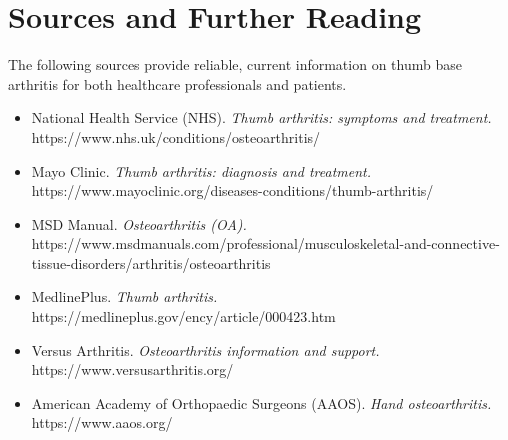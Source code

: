 \section*{Sources and Further Reading}
The following sources provide reliable, current information on thumb base arthritis for both healthcare professionals and patients.
\begin{itemize}
    \item National Health Service (NHS). \textit{Thumb arthritis: symptoms and treatment.} https://www.nhs.uk/conditions/osteoarthritis/
    \item Mayo Clinic. \textit{Thumb arthritis: diagnosis and treatment.} https://www.mayoclinic.org/diseases-conditions/thumb-arthritis/
    \item MSD Manual. \textit{Osteoarthritis (OA).} https://www.msdmanuals.com/professional/musculoskeletal-and-connective-tissue-disorders/arthritis/osteoarthritis
    \item MedlinePlus. \textit{Thumb arthritis.} https://medlineplus.gov/ency/article/000423.htm
    \item Versus Arthritis. \textit{Osteoarthritis information and support.} https://www.versusarthritis.org/
    \item American Academy of Orthopaedic Surgeons (AAOS). \textit{Hand osteoarthritis.} https://www.aaos.org/
\end{itemize}
